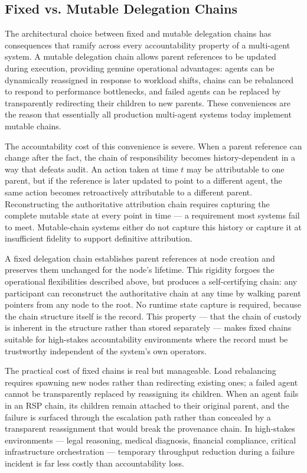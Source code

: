 \subsection{Fixed vs. Mutable Delegation Chains}\label{sec:fixed-v-mutable}

The architectural choice between fixed and mutable delegation chains has consequences that ramify across every accountability property of a multi-agent system. A mutable delegation chain allows parent references to be updated during execution, providing genuine operational advantages: agents can be dynamically reassigned in response to workload shifts, chains can be rebalanced to respond to performance bottlenecks, and failed agents can be replaced by transparently redirecting their children to new parents. These conveniences are the reason that essentially all production multi-agent systems today implement mutable chains.

The accountability cost of this convenience is severe. When a parent reference can change after the fact, the chain of responsibility becomes history-dependent in a way that defeats audit. An action taken at time $t$ may be attributable to one parent, but if the reference is later updated to point to a different agent, the same action becomes retroactively attributable to a different parent. Reconstructing the authoritative attribution chain requires capturing the complete mutable state at every point in time — a requirement most systems fail to meet. Mutable-chain systems either do not capture this history or capture it at insufficient fidelity to support definitive attribution.

A fixed delegation chain establishes parent references at node creation and preserves them unchanged for the node's lifetime. This rigidity forgoes the operational flexibilities described above, but produces a self-certifying chain: any participant can reconstruct the authoritative chain at any time by walking parent pointers from any node to the root. No runtime state capture is required, because the chain structure itself is the record. This property — that the chain of custody is inherent in the structure rather than stored separately — makes fixed chains suitable for high-stakes accountability environments where the record must be trustworthy independent of the system's own operators.

The practical cost of fixed chains is real but manageable. Load rebalancing requires spawning new nodes rather than redirecting existing ones; a failed agent cannot be transparently replaced by reassigning its children. When an agent fails in an RSP chain, its children remain attached to their original parent, and the failure is surfaced through the escalation path rather than concealed by a transparent reassignment that would break the provenance chain. In high-stakes environments — legal reasoning, medical diagnosis, financial compliance, critical infrastructure orchestration — temporary throughput reduction during a failure incident is far less costly than accountability loss.

